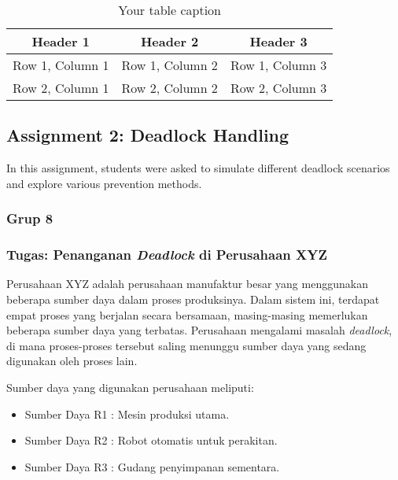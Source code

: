 \documentclass[12pt]{article}
\begin{document}
\begin{table}[htbp] %
    \centering
    \begin{tabular}{|c|c|c|} %
    \hline
    Header 1 & Header 2 & Header 3 \\ %
    \hline
    Row 1, Column 1 & Row 1, Column 2 & Row 1, Column 3 \\ %
    \hline
    Row 2, Column 1 & Row 2, Column 2 & Row 2, Column 3 \\ %
    \hline
    \end{tabular}
    \caption{Your table caption} %
    \label{tab:your_label} %
\end{table}

\subsection{Assignment 2: Deadlock Handling}
In this assignment, students were asked to simulate different deadlock scenarios and explore various prevention methods.
\subsubsection{Grup 8}
\subsubsection{Tugas: Penanganan \textit{Deadlock} di Perusahaan XYZ}
Perusahaan XYZ adalah perusahaan manufaktur besar yang menggunakan beberapa sumber daya dalam proses produksinya. Dalam sistem ini, terdapat empat proses yang berjalan secara bersamaan, masing-masing memerlukan beberapa sumber daya yang terbatas. Perusahaan mengalami masalah \textit{deadlock}, di mana proses-proses tersebut saling menunggu sumber daya yang sedang digunakan oleh proses lain. 

Sumber daya yang digunakan perusahaan meliputi:
\begin{itemize}
    \item Sumber Daya R1 : Mesin produksi utama.
    \item Sumber Daya R2 : Robot otomatis untuk perakitan.
    \item Sumber Daya R3 : Gudang penyimpanan sementara.
\end{itemize}
\end{document}
